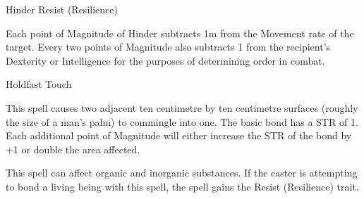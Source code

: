 \begin{samepage}
\begin{rpg-spell}
{Hinder}
{Resist (Resilience)}

Each point of Magnitude of Hinder subtracts 1m from the Movement rate of the target. Every two points of Magnitude also subtracts 1 from the recipient’s Dexterity or Intelligence for the purposes of determining order in combat. 
\end{rpg-spell}
\end{samepage}


\begin{samepage}
\begin{rpg-spell}
{Holdfast}
{Touch}

This spell causes two adjacent ten centimetre by ten centimetre surfaces (roughly the size of a man’s palm) to commingle into one. The basic bond has a STR of 1. Each additional point of Magnitude will either increase the STR of the bond by +1 or double the area affected. 

This spell can affect organic and inorganic substances. If the caster is attempting to bond a living being with this spell, the spell gains the Resist (Resilience) trait.
\end{rpg-spell}
\end{samepage}


